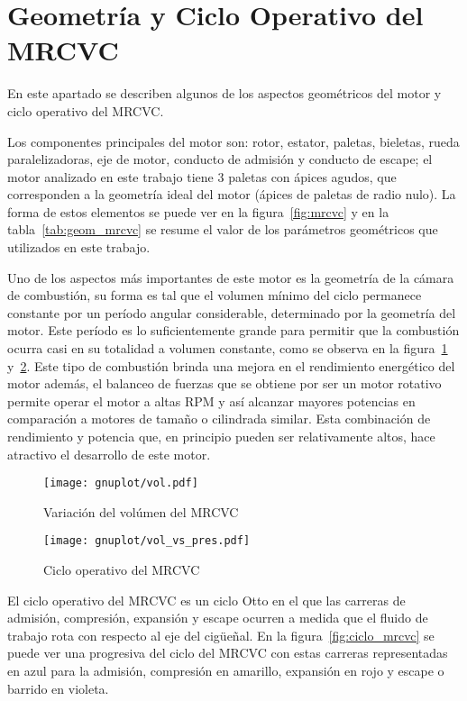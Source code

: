 \section{Geometría y Ciclo Operativo del MRCVC}
%
En este apartado se describen algunos de los aspectos geométricos del motor y
ciclo operativo del MRCVC.

Los componentes principales del motor son: rotor, estator, paletas, bieletas,
rueda paralelizadoras, eje de motor, conducto de admisión y conducto de escape;
el motor analizado en este trabajo tiene 3 paletas con ápices agudos, que
corresponden a la geometría ideal del motor (ápices de paletas de radio nulo).
%
La forma de estos elementos se puede ver en la figura~\ref{fig:mrcvc} y en la
tabla~\ref{tab:geom_mrcvc} se resume el valor de los parámetros geométricos que
utilizados en este trabajo.

Uno de los aspectos más importantes de este motor es la geometría de la cámara
de combustión, su forma es tal que el volumen mínimo del ciclo permanece
constante por un período angular considerable, determinado por la geometría del
motor.
%
Este período es lo suficientemente grande para permitir que la combustión ocurra
casi en su totalidad a volumen constante, como se observa en la
figura~\ref{fig:mrcvc_vol_cte} y~\ref{fig:PV_mrcvc}.
%
Este tipo de combustión brinda una mejora en el rendimiento energético del motor
además, el balanceo de fuerzas que se obtiene por ser un motor rotativo permite
operar el motor a altas RPM y así alcanzar mayores potencias en comparación a
motores de tamaño o cilindrada similar.
%
Esta combinación de rendimiento y potencia que, en principio pueden ser
relativamente altos, hace atractivo el desarrollo de este motor.
%


\begin{figure}[ht]
  \centering
  \texttt{[image: gnuplot/vol.pdf]}
  \caption{Variación del volúmen del MRCVC}\label{fig:mrcvc_vol_cte}
\end{figure}

\begin{figure}[ht]
  \centering
  \texttt{[image: gnuplot/vol\_vs\_pres.pdf]}
  \caption{Ciclo operativo del MRCVC}\label{fig:PV_mrcvc}
\end{figure}


El ciclo operativo del MRCVC es un ciclo Otto en el que las carreras de
admisión, compresión, expansión y escape ocurren a medida que el fluido de
trabajo rota con respecto al eje del cigüeñal.
%
En la figura~\ref{fig:ciclo_mrcvc} se puede ver una progresiva del ciclo del
MRCVC con estas carreras representadas en azul para la admisión, compresión en
amarillo, expansión en rojo y escape o barrido en violeta.

